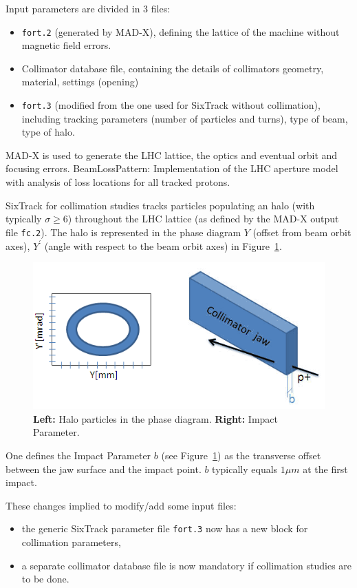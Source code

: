 \bigskip
\noindent Input parameters are divided in 3 files:
\begin{itemize}
    \item \texttt{fort.2} (generated by MAD-X), defining the lattice of the machine without magnetic field errors.
    \item Collimator database file, containing the details of collimators geometry, material, settings (opening)
    \item \texttt{fort.3} (modified from the one used for SixTrack without collimation), including tracking parameters (number of particles and turns), type of beam, type of halo.
\end{itemize}

\noindent MAD-X is used to generate the LHC lattice, the optics and eventual orbit and focusing errors.
BeamLossPattern: Implementation of the LHC aperture model with analysis of loss locations for all tracked protons.

SixTrack for collimation studies tracks particles populating an halo (with typically $\sigma \geq 6$) throughout the LHC lattice (as defined by the MAD-X output file \texttt{fc.2}).
The halo is represented in the phase diagram $Y$ (offset from beam orbit axes), $Y^\prime$ (angle with respect to the beam orbit axes) in Figure~\ref{Coll:Fig1}.
\begin{figure}[H]
\begin{center}
    \includegraphics[width=0.5\linewidth]{figures/coll_fig1}
    \caption{\label{Coll:Fig1} \textbf{Left:} Halo particles in the phase diagram. \textbf{Right:} Impact Parameter.}
\end{center}
\end{figure}

One defines the Impact Parameter $b$ (see Figure~\ref{Coll:Fig1}) as the transverse offset between the jaw surface and the impact point.
$b$ typically equals $1\mu m$ at the first impact.

\bigskip
\noindent These changes implied to modify/add some input files:
\begin{itemize}
    \item the generic SixTrack parameter file \texttt{fort.3} now has a new block for collimation parameters,
    \item a separate collimator database file is now mandatory if collimation studies are to be done.
\end{itemize}

